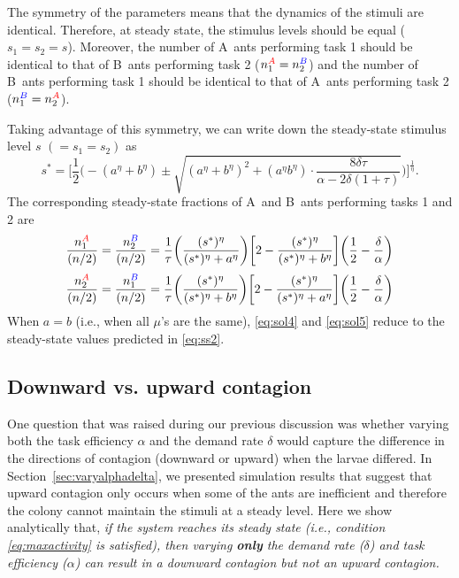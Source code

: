 \documentclass[11pt]{article}
\newcommand{\A}{{\color{red}A}}
\newcommand{\B}{{\color{blue}B}}
\begin{document}
\begin{appendices}
The symmetry of the parameters means that the dynamics of the stimuli are identical. Therefore, at steady state, the stimulus levels should be equal ($s_1 = s_2 = s$). Moreover, the number of \A\ ants performing task 1 should be identical to that of \B\ ants performing task 2 ($n_{1}^{\A} = n_{2}^{\B}$) and the number of \B\ ants performing task 1 should be identical to that of \A\ ants performing task 2 ($n_{1}^{\B} = n_{2}^{\A}$).

Taking advantage of this symmetry, we can write down the steady-state stimulus level $s$ $(=s_1 = s_2)$ as
\begin{equation}
    s^* = \bigg[\frac{1}{2} \bigg( -({a}^\eta + {b}^\eta) 
    \pm \sqrt{
    ({a}^\eta + {b}^\eta)^2 + ({a}^\eta {b}^\eta)\cdot \frac{8\delta \tau}{\alpha - 2\delta (1+\tau)}
    } \bigg)\bigg]^\frac{1}{\eta}.
\end{equation}
The corresponding steady-state fractions of \A\ and \B\ ants performing tasks 1 and 2 are
\begin{equation}
    \frac{n_1^{\A}}{(n/2)} =  \frac{n_2^{\B}}{(n/2)} = \frac{1}{\tau} \bigg(\frac{(s^*)^\eta}{(s^*)^\eta + {a}^\eta} \bigg)\bigg[2 - \frac{(s^*)^\eta}{(s^*)^\eta + {b}^\eta}  \bigg] \bigg(\frac{1}{2} - \frac{\delta}{\alpha} \bigg)
    \label{eq:sol4}
\end{equation}
\begin{equation}
    \frac{n_2^{\A}}{(n/2)} =  \frac{n_1^{\B}}{(n/2)}  = \frac{1}{\tau} \bigg(\frac{(s^*)^\eta}{(s^*)^\eta + {b}^\eta} \bigg)\bigg[2 - \frac{(s^*)^\eta}{(s^*)^\eta + {a}^\eta}  \bigg] \bigg(\frac{1}{2} - \frac{\delta}{\alpha} \bigg)
    \label{eq:sol5}
\end{equation}
When $a = b$ (i.e., when all $\mu$'s are the same), \eqref{eq:sol4} and \eqref{eq:sol5} reduce to the steady-state values predicted in \eqref{eq:ss2}.

\subsection{Downward vs. upward contagion} \label{sec:updown}

One question that was raised during our previous discussion was whether varying both the task efficiency $\alpha$ and the demand rate $\delta$ would capture the difference in the directions of contagion (downward or upward) when the larvae differed. In Section~\ref{sec:varyalphadelta}, we presented simulation results that suggest that upward contagion only occurs when some of the ants are inefficient and therefore the colony cannot maintain the stimuli at a steady level. Here we show analytically that, \textit{if the system reaches its steady state (i.e., condition \eqref{eq:maxactivity} is satisfied), then varying \textbf{only} the demand rate ($\delta$) and task efficiency ($\alpha$) can result in a downward contagion but not an upward contagion.}


\end{appendices}
\end{document}
